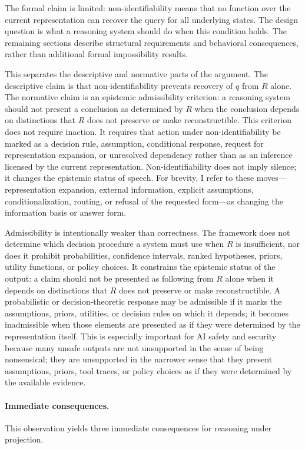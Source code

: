 \documentclass[11pt]{article}
\begin{document}
The formal claim is limited: non-identifiability means that no function over the current representation can recover the query for all underlying states. The design question is what a reasoning system should do when this condition holds. The remaining sections describe structural requirements and behavioral consequences, rather than additional formal impossibility results.

This separates the descriptive and normative parts of the argument. The descriptive claim is that non-identifiability prevents recovery of $q$ from $R$ alone. The normative claim is an epistemic admissibility criterion: a reasoning system should not present a conclusion as determined by $R$ when the conclusion depends on distinctions that $R$ does not preserve or make reconstructible. This criterion does not require inaction. It requires that action under non-identifiability be marked as a decision rule, assumption, conditional response, request for representation expansion, or unresolved dependency rather than as an inference licensed by the current representation. Non-identifiability does not imply silence; it changes the epistemic status of speech. For brevity, I refer to these moves---representation expansion, external information, explicit assumptions, conditionalization, routing, or refusal of the requested form---as changing the information basis or answer form.

Admissibility is intentionally weaker than correctness. The framework does not determine which decision procedure a system must use when $R$ is insufficient, nor does it prohibit probabilities, confidence intervals, ranked hypotheses, priors, utility functions, or policy choices. It constrains the epistemic status of the output: a claim should not be presented as following from $R$ alone when it depends on distinctions that $R$ does not preserve or make reconstructible. A probabilistic or decision-theoretic response may be admissible if it marks the assumptions, priors, utilities, or decision rules on which it depends; it becomes inadmissible when those elements are presented as if they were determined by the representation itself. This is especially important for AI safety and security because many unsafe outputs are not unsupported in the sense of being nonsensical; they are unsupported in the narrower sense that they present assumptions, priors, tool traces, or policy choices as if they were determined by the available evidence.

\paragraph{Immediate consequences.}
This observation yields three immediate consequences for reasoning under projection.
\end{document}
